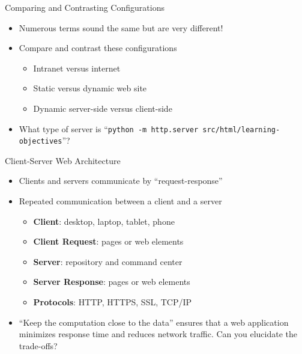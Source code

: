 \documentclass[14pt,aspectratio=169]{beamer}
\begin{document}
%
\begin{frame}{Comparing and Contrasting Configurations}
%
  \begin{itemize}
    \item Numerous terms sound the same but are very different!
    \item Compare and contrast these configurations
      \begin{itemize}
        \item Intranet versus internet
        \item Static versus dynamic web site
        \item Dynamic server-side versus client-side
      \end{itemize}
    \item What type of server is ``{\tt python -m http.server
      src/html/learning-objectives}''?
  \end{itemize}
%
\end{frame}

%
\begin{frame}{Client-Server Web Architecture}
  \begin{itemize}
    \item Clients and servers communicate by ``request-response''
      \vspace*{-.2in}
    \item Repeated communication between a client and a server
      \begin{itemize}
        \item {\bf Client}: desktop, laptop, tablet, phone
        \item {\bf Client Request}: pages or web elements
        \item {\bf Server}: repository and command center
        \item {\bf Server Response}: pages or web elements
        \item {\bf Protocols}: HTTP, HTTPS, SSL, TCP/IP
      \end{itemize}
      \vspace*{-.2in}
    \item ``Keep the computation close to the data''
      ensures that a web application minimizes response time and reduces
      network traffic. Can you elucidate the trade-offs?
  \end{itemize}
\end{frame}
\end{document}
